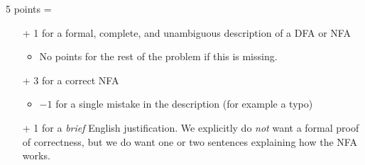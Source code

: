 \documentclass[11pt]{article}
\begin{document}
\begin{enumerate}
\begin{rubric}
5 points =
\begin{itemize}\cramped
\item[+] 1 for a formal, complete, and unambiguous description of a DFA or NFA
\begin{itemize}\cramped
\item No points for the rest of the problem if this is missing.
\end{itemize}
\item[+] 3 for a correct NFA
\begin{itemize}\cramped
\item $-1$ for a single mistake in the description (for example a typo)
\end{itemize}
\item[+] 1 for a \emph{brief} English justification.  We explicitly do \emph{not} want a formal proof of correctness, but we do want one or two sentences explaining how the NFA works.
\end{itemize}
\end{rubric}





\end{enumerate}
\end{document}
